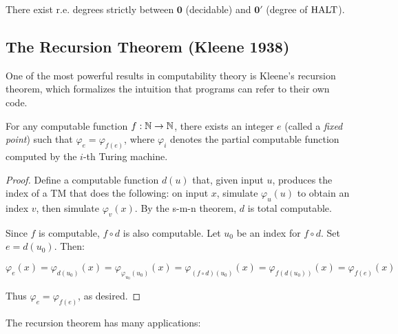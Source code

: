 \begin{theorem}
There exist r.e. degrees strictly between $\mathbf{0}$ (decidable) and $\mathbf{0}'$ (degree of $\text{HALT}$).
\end{theorem}

\subsection*{The Recursion Theorem (Kleene 1938)}

One of the most powerful results in computability theory is Kleene's recursion theorem, which formalizes the intuition that programs can refer to their own code.

\begin{theorem}
For any computable function $f: \mathbb{N} \to \mathbb{N}$, there exists an integer $e$ (called a \emph{fixed point}) such that $\varphi_e = \varphi_{f(e)}$, where $\varphi_i$ denotes the partial computable function computed by the $i$-th Turing machine.
\end{theorem}

\begin{proof}
Define a computable function $d(u)$ that, given input $u$, produces the index of a TM that does the following: on input $x$, simulate $\varphi_u(u)$ to obtain an index $v$, then simulate $\varphi_v(x)$. By the s-m-n theorem, $d$ is total computable.

Since $f$ is computable, $f \circ d$ is also computable. Let $u_0$ be an index for $f \circ d$. Set $e = d(u_0)$. Then:

\[
\varphi_e(x) = \varphi_{d(u_0)}(x) = \varphi_{\varphi_{u_0}(u_0)}(x) = \varphi_{(f \circ d)(u_0)}(x) = \varphi_{f(d(u_0))}(x) = \varphi_{f(e)}(x)
\]

Thus $\varphi_e = \varphi_{f(e)}$, as desired.
\end{proof}

The recursion theorem has many applications:

